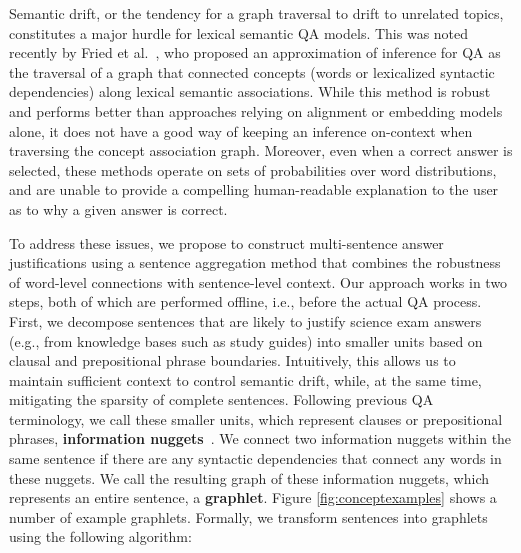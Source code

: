 Semantic drift, or the tendency for a graph traversal to drift to unrelated topics,
constitutes a major hurdle for lexical semantic QA models.  
This was noted recently by Fried et al.~\citeyear{fried2015higher}, who proposed an approximation of inference for QA as the traversal of a graph that connected concepts (words or lexicalized syntactic dependencies) along lexical semantic associations. While this method is robust and performs better than approaches relying on alignment or embedding models alone, it does not have a good way of keeping an inference on-context when traversing the concept association graph.
Moreover, even when a correct answer is selected, these methods operate on sets of probabilities over word distributions, and are unable to provide a compelling human-readable explanation to the user as to why a given answer is correct. 

To address these issues, we propose to construct multi-sentence answer justifications using a  sentence aggregation method that combines the robustness of word-level connections with sentence-level context.  
Our approach works in two steps, both of which are performed offline, i.e., before the actual QA process. First, we decompose sentences that are likely to justify science exam answers (e.g., from knowledge bases such as study guides) into smaller units based on clausal and prepositional phrase boundaries. Intuitively, this allows us to maintain sufficient context to control semantic drift, while, at the same time, mitigating the sparsity of complete sentences.  
Following previous QA terminology, we call these smaller units,  which represent clauses or prepositional phrases, {\bf information nuggets}~\cite{Voorhees:2003}. We connect two information nuggets within the same sentence if there are any syntactic dependencies that connect any words in these nuggets. We call the resulting graph of these information nuggets, which represents an entire sentence, a \textbf{graphlet}. 
Figure \ref{fig:conceptexamples} shows a number of example graphlets. 
Formally, we transform sentences into graphlets using the following algorithm:


